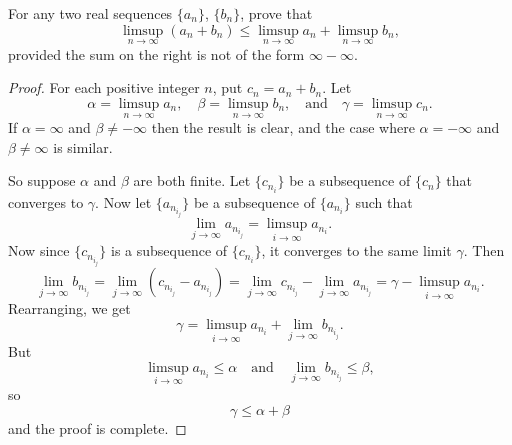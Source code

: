  For any two real sequences $\{a_n\}$, $\{b_n\}$, prove that
\begin{equation*}
  \limsup_{n\to\infty}(a_n + b_n)
  \leq \limsup_{n\to\infty}a_n + \limsup_{n\to\infty}b_n,
\end{equation*}
provided the sum on the right is not of the form $\infty - \infty$.
\begin{proof}
  For each positive integer $n$, put $c_n = a_n + b_n$. Let
  \begin{equation*}
    \alpha = \limsup_{n\to\infty}a_n,
    \quad
    \beta = \limsup_{n\to\infty}b_n,
    \quad\text{and}\quad
    \gamma = \limsup_{n\to\infty}c_n.
  \end{equation*}
  If $\alpha = \infty$ and $\beta\neq-\infty$ then the result is
  clear, and the case where $\alpha = -\infty$ and $\beta\neq\infty$
  is similar.

  So suppose $\alpha$ and $\beta$ are both finite. Let $\{c_{n_i}\}$
  be a subsequence of $\{c_n\}$ that converges to $\gamma$. Now let
  $\{a_{n_{i_j}}\}$ be a subsequence of $\{a_{n_i}\}$ such that
  \begin{equation*}
    \lim_{j\to\infty}a_{n_{i_j}} = \limsup_{i\to\infty}a_{n_i}.
  \end{equation*}
  Now since $\{c_{n_{i_j}}\}$ is a subsequence of $\{c_{n_i}\}$, it
  converges to the same limit $\gamma$. Then
  \begin{equation*}
    \lim_{j\to\infty}b_{n_{i_j}} = \lim_{j\to\infty}(c_{n_{i_j}} - a_{n_{i_j}})
    = \lim_{j\to\infty}c_{n_{i_j}} - \lim_{j\to\infty}a_{n_{i_j}}
    = \gamma - \limsup_{i\to\infty}a_{n_i}.
  \end{equation*}
  Rearranging, we get
  \begin{equation*}
    \gamma = \limsup_{i\to\infty}a_{n_i} + \lim_{j\to\infty}b_{n_{i_j}}.
  \end{equation*}
  But
  \begin{equation*}
    \limsup_{i\to\infty}a_{n_i} \leq \alpha
    \quad\text{and}\quad
    \lim_{j\to\infty}b_{n_{i_j}} \leq \beta,
  \end{equation*}
  so
  \begin{equation*}
    \gamma \leq \alpha + \beta
  \end{equation*}
  and the proof is complete.
\end{proof}

